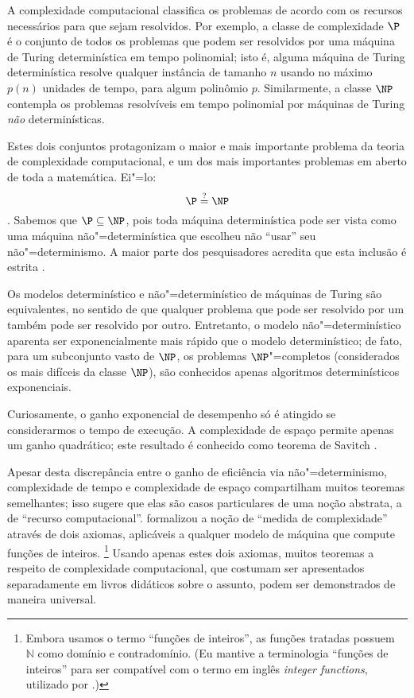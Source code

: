 A complexidade computacional classifica os problemas
de acordo com os recursos necessários para que sejam resolvidos.
Por exemplo,
a classe de complexidade $\P$
é o conjunto de todos os problemas que podem ser resolvidos
por uma máquina de Turing determinística
em tempo polinomial;
isto é,
alguma máquina de Turing determinística
resolve qualquer instância de tamanho $n$
usando no máximo $p(n)$ unidades de tempo,
para algum polinômio $p$.
Similarmente,
a classe $\NP$
contempla os problemas resolvíveis em tempo polinomial
por máquinas de Turing \emph{não} determinísticas.

Estes dois conjuntos protagonizam
o maior e mais importante problema da teoria de complexidade computacional,
e um dos mais importantes problemas em aberto de toda a matemática.
Ei"=lo:
\begin{equation*}
    \P \stackrel?= \NP
\end{equation*}
\cite[p.~270]{Sipser2006}.
Sabemos que $\P \subseteq \NP$,
pois toda máquina determinística pode ser vista como
uma máquina não"=determinística que escolheu não ``usar''
seu não"=determinismo.
A maior parte dos pesquisadores acredita que
esta inclusão é estrita \cite[p.~54]{Gasarch2012}.

Os modelos determinístico e não"=determinístico de máquinas de Turing são equivalentes,
no sentido de que qualquer problema que pode ser resolvido por um
também pode ser resolvido por outro.
Entretanto, o modelo não"=determinístico
aparenta ser exponencialmente mais rápido que
o modelo determinístico;
de fato, para um subconjunto vasto de $\NP$,
os problemas $\NP$"=completos
(considerados os mais difíceis da classe $\NP$),
são conhecidos apenas algoritmos determinísticos exponenciais.

Curiosamente,
o ganho exponencial de desempenho
só é atingido se considerarmos o tempo de execução.
A complexidade de espaço permite apenas um ganho quadrático;
este resultado é conhecido como teorema de Savitch
\cite[p.~86]{AroraBarak2009}.

Apesar desta discrepância entre o ganho de eficiência via não"=determinismo,
complexidade de tempo e complexidade de espaço
compartilham muitos teoremas semelhantes;
isso sugere que elas são casos particulares de uma noção abstrata,
a de ``recurso computacional''.
 formalizou a noção de ``medida de complexidade''
através de dois axiomas,
aplicáveis a qualquer modelo de máquina que compute funções de inteiros.%
\footnote{
    Embora usamos o termo ``funções de inteiros'',
    as funções tratadas possuem~$\mathbb N$ como domínio e contradomínio.
    (Eu mantive a terminologia ``funções de inteiros''
    para ser compatível com o termo em inglês \emph{integer functions},
    utilizado por .)
}
Usando apenas estes dois axiomas,
muitos teoremas a respeito de complexidade computacional,
que costumam ser apresentados separadamente em livros didáticos sobre o assunto,
podem ser demonstrados de maneira universal.

